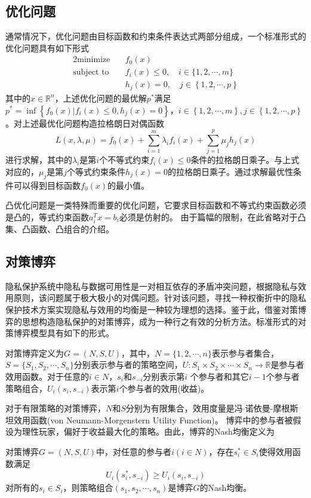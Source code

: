 \subsection{优化问题}
通常情况下，优化问题由目标函数和约束条件表达式两部分组成，一个标准形式的优化问题\cite{boyd2004convex}具有如下形式
 \begin{alignat}{2}
   \mbox{minimize}\quad & f_{0}(x) \nonumber\\
   \mbox{subject to} \quad
   & f_i(x)\leq 0,\quad i \in\{1,2,\cdots,m\} \\
   & h_j(x)=0,\quad j\in \left\{1,2,\cdots,p\right\}
   \end{alignat}
其中的$x\in \mathbb{R}^{n}$，上述优化问题的最优解$p^{*}$满足
$p^{*}=\inf \left\{f_0(x)|f_i(x)\leq 0, h_j(x)=0\right\}$，$i \in\left\{1,2,\cdots,m\right\},j\in\left\{1,2,\cdots,p\right\}$。对上述最优化问题构造拉格朗日对偶函数
\begin{equation}
	L(x,\lambda,\mu)=f_0(x)+\sum_{i=1}^{m}\lambda_i f_i(x)+\sum_{j=1}^{p}\mu_j h_j(x)
\end{equation}
进行求解，其中的$\lambda_i$是第$i$个不等式约束$f_i(x)\leq 0$条件的拉格朗日乘子。与上式对应的，$\mu_j$是第$j$个等式约束条件$h_j(x)=0$的拉格朗日乘子。通过求解最优性条件可以得到目标函数$f_{0}(x)$的最小值。

凸优化问题是一类特殊而重要的优化问题，它要求目标函数和不等式约束函数必须是凸的，等式约束函数$a_i^T x = b_i$必须是仿射的\cite{boyd2004convex}。 由于篇幅的限制，在此省略对于凸集、凸函数、凸组合的介绍。

\subsection{对策博弈}
隐私保护系统中隐私与数据可用性是一对相互依存的矛盾冲突问题，根据隐私与效用原则\cite{sankar2013utility}，该问题属于极大极小的对偶问题。针对该问题，寻找一种权衡折中的隐私保护技术方案实现隐私与效用的均衡是一种较为理想的选择。鉴于此，借鉴对策博弈的思想构造隐私保护的对策博弈，成为一种行之有效的分析方法。标准形式的对策博弈模型具有如下的形式。
\begin{definition}对策博弈定义为$G=(N,S,U)$，其中，$N=\{1,2,\cdots,n\}$表示参与者集合，$S=\{S_1,S_2,\cdots,S_n\}$分别表示参与者的策略空间，$U:S_1 \times S_2 \times \cdots \times S_n \rightarrow \mathbb{R}$是参与者效用函数。对于任意的$i\in N$，$s_i$和$s_{-i}$分别表示第$i$ 个参与者和其它$i-1$个参与者策略组合，$U_i(s_i,s_{-i})$表示第$i$个参与者的效用(收益)。
\end{definition}

对于有限策略的对策博弈，$N$和$S$分别为有限集合，效用度量是冯$\cdot$诺依曼-摩根斯坦效用函数(von Neumann-Morgenstern Utility Function)。 博弈中的参与者被假设为理性玩家，偏好于收益最大化的策略。由此，博弈的Nash均衡定义为
\begin{definition}[Nash均衡]对策博弈$G=(N,S,U)$中，对任意的参与者$i (i\in N)$，存在$s_i^* \in S_i$使得效用函数满足
	\begin{equation}
		U_i(s_i^*,s_{-i}) \geq U_i(s_i,s_{-i})
	\end{equation}
对所有的$s_i \in S_{i}$，则策略组合$(s_1,s_2,\cdots,s_n)$是博弈$G$的Nash均衡。
\end{definition}

